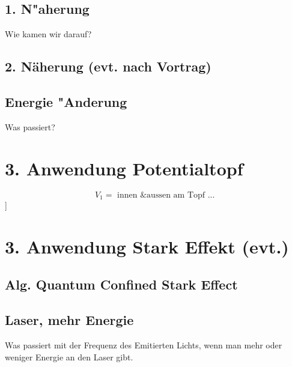 \begin{refsection}
\subsection{ 1. N"aherung }

Wie kamen wir darauf?

\subsection{ 2. N\"aherung (evt. nach Vortrag) }

\subsection{ Energie "Anderung }

Was passiert?

\section{ 3. Anwendung Potentialtopf }

\[
  V_1 = \text{ innen \& aussen am Topf ... }
\]
]

\section{ 3. Anwendung Stark Effekt (evt.) }

\subsection{ Alg. Quantum Confined Stark Effect }

\subsection{ Laser, mehr Energie }
Was passiert mit der Frequenz des Emitierten Lichts, wenn man mehr oder weniger Energie an den Laser gibt.

\printbibliography[heading=subbibliography]
\end{refsection}
